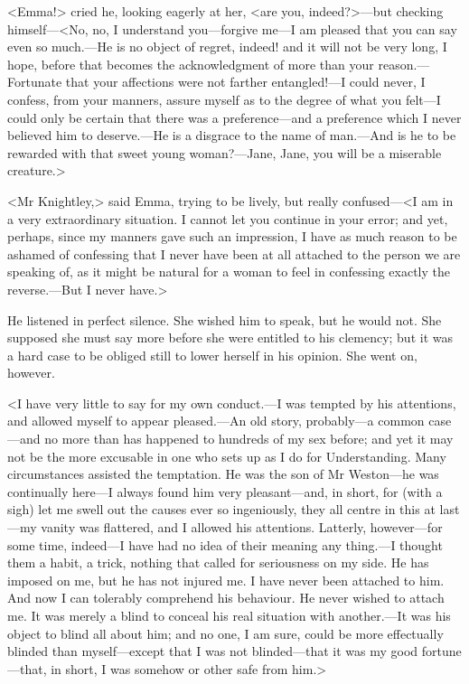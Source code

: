 <Emma!> cried he, looking eagerly at her, <are you, indeed?>—but checking himself—<No, no, I understand you—forgive me—I am pleased that you can say even so much.—He is no object of regret, indeed! and it will not be very long, I hope, before that becomes the acknowledgment of more than your reason.—Fortunate that your affections were not farther entangled!—I could never, I confess, from your manners, assure myself as to the degree of what you felt—I could only be certain that there was a preference—and a preference which I never believed him to deserve.—He is a disgrace to the name of man.—And is he to be rewarded with that sweet young woman?—Jane, Jane, you will be a miserable creature.>

<Mr Knightley,> said Emma, trying to be lively, but really confused—<I am in a very extraordinary situation. I cannot let you continue in your error; and yet, perhaps, since my manners gave such an impression, I have as much reason to be ashamed of confessing that I never have been at all attached to the person we are speaking of, as it might be natural for a woman to feel in confessing exactly the reverse.—But I never have.>

He listened in perfect silence. She wished him to speak, but he would not. She supposed she must say more before she were entitled to his clemency; but it was a hard case to be obliged still to lower herself in his opinion. She went on, however.

<I have very little to say for my own conduct.—I was tempted by his attentions, and allowed myself to appear pleased.—An old story, probably—a common case—and no more than has happened to hundreds of my sex before; and yet it may not be the more excusable in one who sets up as I do for Understanding. Many circumstances assisted the temptation. He was the son of Mr Weston—he was continually here—I always found him very pleasant—and, in short, for (with a sigh) let me swell out the causes ever so ingeniously, they all centre in this at last—my vanity was flattered, and I allowed his attentions. Latterly, however—for some time, indeed—I have had no idea of their meaning any thing.—I thought them a habit, a trick, nothing that called for seriousness on my side. He has imposed on me, but he has not injured me. I have never been attached to him. And now I can tolerably comprehend his behaviour. He never wished to attach me. It was merely a blind to conceal his real situation with another.—It was his object to blind all about him; and no one, I am sure, could be more effectually blinded than myself—except that I was not blinded—that it was my good fortune—that, in short, I was somehow or other safe from him.>

